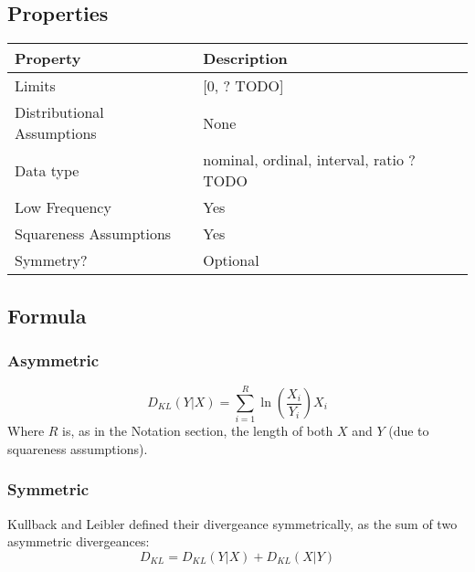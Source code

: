 \documentclass[11pt]{article}
\begin{document}
\subsection{Properties}
\begin{tabular}{| l || l |}
    \hline
    {\bf Property} & {\bf Description} \\
    \hline
    Limits & [0, ? TODO] \\ \hline

    Distributional Assumptions& None \\ \hline

    Data type & nominal, ordinal, interval, ratio ? TODO \\ \hline

    Low Frequency & Yes \\ \hline

    Squareness Assumptions & Yes \\ \hline
    
    Symmetry? & Optional \\ \hline

\end{tabular}


\subsection{Formula}
\subsubsection{Asymmetric}
$$
D_{KL}(Y|X) = \sum_{i=1}^{R}{ \ln \left( \frac{X_i}{Y_i} \right) } X_i
$$
Where $R$ is, as in the Notation section, the length of both $X$ and $Y$ (due to squareness assumptions).

\subsubsection{Symmetric}
Kullback and Leibler defined their divergeance symmetrically, as the sum of two asymmetric divergeances:
$$
D_{KL} = D_{KL}(Y|X) + D_{KL}(X|Y)
$$

\end{document}
